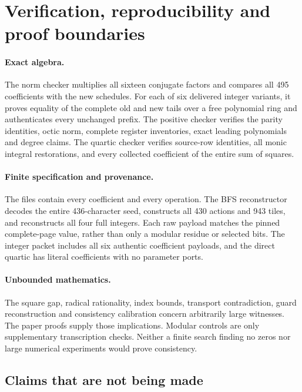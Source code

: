 \section{Verification, reproducibility and proof boundaries}

\paragraph{Exact algebra.}
The norm checker multiplies all sixteen conjugate factors and compares
all 495 coefficients with the new schedules. For each of six delivered
integer variants, it proves equality of the complete old and new tails
over a free polynomial ring and authenticates every unchanged prefix.
The positive checker verifies the parity identities, octic norm,
complete register inventories, exact leading polynomials and degree claims.
The quartic checker verifies source-row identities, all monic integral
restorations, and every collected coefficient of the entire sum of squares.

\paragraph{Finite specification and provenance.}
The files contain every coefficient and every operation.
The BFS reconstructor decodes the entire 436-character seed, constructs
all 430 actions and 943 tiles, and reconstructs all four full integers.
Each raw payload matches the pinned complete-page value, rather than only
a modular residue or selected bits.
The integer packet includes all six authentic coefficient payloads,
and the direct quartic has literal coefficients with no parameter ports.

\paragraph{Unbounded mathematics.}
The square gap, radical rationality, index bounds, transport contradiction,
guard reconstruction and consistency calibration concern arbitrarily
large witnesses. The paper proofs supply those implications.
Modular controls are only supplementary transcription checks.
Neither a finite search finding no zeros nor large numerical experiments
would prove consistency.

\subsection{Claims that are not being made}

